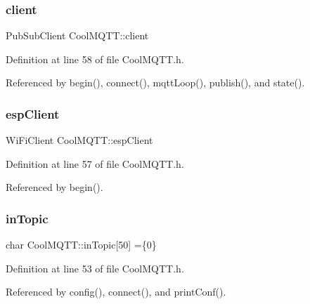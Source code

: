 \subsubsection{\texorpdfstring{client}{client}}
{\footnotesize\ttfamily Pub\+Sub\+Client Cool\+M\+Q\+T\+T\+::client\hspace{0.3cm}{\ttfamily [private]}}



Definition at line 58 of file Cool\+M\+Q\+T\+T.\+h.



Referenced by begin(), connect(), mqtt\+Loop(), publish(), and state().

\mbox{\label{classCoolMQTT_acc30a0200967374a524092a8a806502a}} 
\subsubsection{\texorpdfstring{esp\+Client}{espClient}}
{\footnotesize\ttfamily Wi\+Fi\+Client Cool\+M\+Q\+T\+T\+::esp\+Client\hspace{0.3cm}{\ttfamily [private]}}



Definition at line 57 of file Cool\+M\+Q\+T\+T.\+h.



Referenced by begin().

\mbox{\label{classCoolMQTT_a4492f52a441e83cc5151010317fdb52d}} 
\subsubsection{\texorpdfstring{in\+Topic}{inTopic}}
{\footnotesize\ttfamily char Cool\+M\+Q\+T\+T\+::in\+Topic\mbox{[}50\mbox{]} =\{\textquotesingle{}0\textquotesingle{}\}\hspace{0.3cm}{\ttfamily [private]}}



Definition at line 53 of file Cool\+M\+Q\+T\+T.\+h.



Referenced by config(), connect(), and print\+Conf().

\mbox{\label{classCoolMQTT_ab8bb951f87ddbf92db74c2ad16a3e53e}} 
